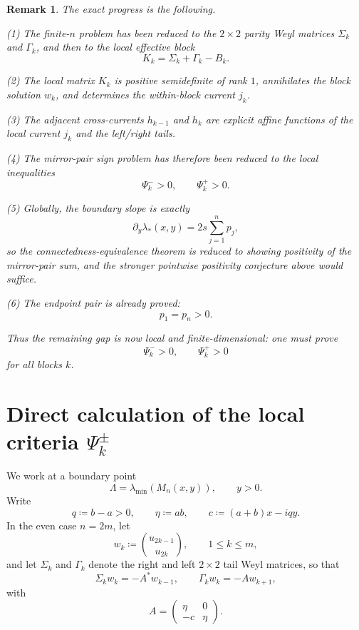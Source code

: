 \documentclass[11pt]{article}
\providecommand{\texorpdfstring}[2]{#1}
\newtheorem{remark}[theorem]{Remark}
\begin{document}
\begin{remark}
The exact progress is the following.

\smallskip
\noindent
\textup{(1)} The finite-\(n\) problem has been reduced to the \(2\times2\) parity Weyl matrices
\(\Sigma_k\) and \(\Gamma_k\), and then to the local effective block
\[
K_k=\Sigma_k+\Gamma_k-B_k.
\]

\smallskip
\noindent
\textup{(2)} The local matrix \(K_k\) is positive semidefinite of rank \(1\), annihilates the
block solution \(w_k\), and determines the within-block current \(j_k\).

\smallskip
\noindent
\textup{(3)} The adjacent cross-currents \(h_{k-1}\) and \(h_k\) are explicit affine functions of
the local current \(j_k\) and the left/right tails.

\smallskip
\noindent
\textup{(4)} The mirror-pair sign problem has therefore been reduced to the local inequalities
\[
\Psi_k^- >0,\qquad \Psi_k^+>0.
\]

\smallskip
\noindent
\textup{(5)} Globally, the boundary slope is exactly
\[
\partial_y\lambda_*(x,y)=2s\sum_{j=1}^n p_j,
\]
so the connectedness-equivalence theorem is reduced to showing positivity of the mirror-pair
sum, and the stronger pointwise positivity conjecture above would suffice.

\smallskip
\noindent
\textup{(6)} The endpoint pair is already proved:
\[
p_1=p_n>0.
\]

\smallskip
Thus the remaining gap is now local and finite-dimensional: one must prove
\[
\Psi_k^- >0,\qquad \Psi_k^+>0
\]
for all blocks \(k\).
\end{remark}

\section{Direct calculation of the local criteria \texorpdfstring{$\Psi_k^\pm$}{Psi}}

We work at a boundary point
\[
\Lambda=\lambda_{\min}(M_n(x,y)),
\qquad
y>0.
\]
Write
\[
q\coloneqq b-a>0,
\qquad
\eta\coloneqq ab,
\qquad
c\coloneqq (a+b)x-iqy.
\]
In the even case \(n=2m\), let
\[
w_k\coloneqq \binom{u_{2k-1}}{u_{2k}},
\qquad
1\le k\le m,
\]
and let \(\Sigma_k\) and \(\Gamma_k\) denote the right and left \(2\times2\) tail Weyl matrices,
so that
\[
\Sigma_k w_k=-A^*w_{k-1},
\qquad
\Gamma_k w_k=-Aw_{k+1},
\]
with
\[
A=
\begin{pmatrix}
\eta & 0\\
-c & \eta
\end{pmatrix}.
\]
\end{document}

